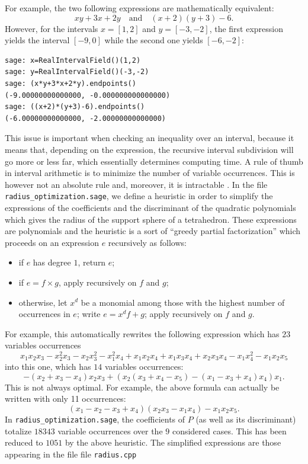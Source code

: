 \documentclass[11pt]{article}
\begin{document}
For example, the two following expressions are mathematically equivalent:
\[
xy+3x+2y
\quad\textrm{and}\quad
(x+2)(y+3)-6.
\]
However, for the intervals $x=[1,2]$ and $y=[-3,-2]$, the first expression yields the interval $[-9,0]$ while the second one yields $[-6,-2]$:
\begin{verbatim}
sage: x=RealIntervalField()(1,2)
sage: y=RealIntervalField()(-3,-2)
sage: (x*y+3*x+2*y).endpoints()
(-9.00000000000000, -0.000000000000000)
sage: ((x+2)*(y+3)-6).endpoints()
(-6.00000000000000, -2.00000000000000)
\end{verbatim}

This issue is important when checking an inequality over an interval, because it means that, depending on the expression, the recursive interval subdivision will go more or less far, which essentially determines computing time.
A rule of thumb in interval arithmetic is to minimize the number of variable occurrences.
This is however not an absolute rule and, moreover, it is intractable \cite{BU11}.
In the file \verb+radius_optimization.sage+, we define a heuristic in order to simplify the expressions of the coefficients and the discriminant of the quadratic polynomials which gives the radius of the support sphere of a tetrahedron.
These expressions are polynomials and the heuristic is a sort of ``greedy partial factorization'' which proceeds on an expression $e$ recursively as follows:
\begin{itemize}
\item if $e$ has degree $1$, return $e$;
\item if $e=f\times g$, apply recursively on $f$ and $g$;
\item otherwise, let $x^d$ be a monomial among those with the highest number of occurrences in $e$; write $e=x^df+g$; apply recursively on $f$ and $g$.
\end{itemize}
For example, this automatically rewrites the following expression which has $23$ variables occurrences
\[
x_{1} x_{2} x_{3} - x_{2}^{2} x_{3} - x_{2} x_{3}^{2} - x_{1}^{2} x_{4} + x_{1} x_{2} x_{4} + x_{1} x_{3} x_{4} + x_{2} x_{3} x_{4} - x_{1} x_{4}^{2} - x_{1} x_{2} x_{5}
\]
into this one, which has $14$ variables occurrences:
\[
-{\left(x_{2} + x_{3} - x_{4}\right)} x_{2} x_{3} + {\left(x_{2} {\left(x_{3} + x_{4} - x_{5}\right)} - {\left(x_{1} - x_{3} + x_{4}\right)} x_{4}\right)} x_{1}.
\]
This is not always optimal.
For example, the above formula can actually be written with only 11 occurrences:
$$
(x_1-x_2-x_3+x_4)(x_2x_3-x_1x_4)-x_1x_2x_5.
$$
In \verb+radius_optimization.sage+, the coefficients of $P$ (as well as its discriminant) totalize $18343$ variable occurrences over the $9$ considered cases.
This has been reduced to $1051$ by the above heuristic.
The simplified expressions are those appearing in the file file \verb+radius.cpp+ 
\end{document}
